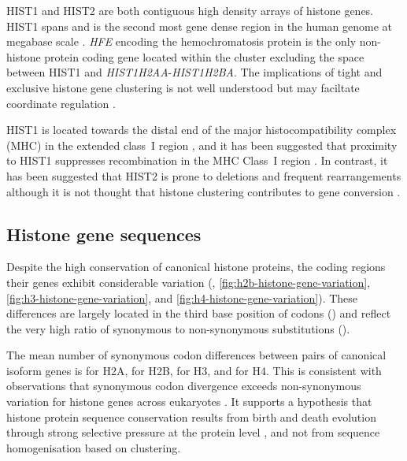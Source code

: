     HIST1 and HIST2 are both contiguous high density arrays of histone genes.
    HIST1 spans \HISTOneSpan{} 
    and is the second most gene dense region in the human genome at megabase scale \citep{MHC-III-analysis}.
    \textit{HFE} encoding the hemochromatosis protein \citep{AlbigDoenecke1998}
    is the only non-histone protein coding gene located within the cluster
    excluding the space between HIST1 and \textit{HIST1H2AA}-\textit{HIST1H2BA}.
    The implications of tight and exclusive histone gene clustering
    is not well understood but may faciltate coordinate regulation \citep{Eirinlopez2009,close-regulators}.

    HIST1 is located towards the distal end of the major histocompatibility complex (MHC)
    in the extended class~I region \citep{MHC-I-transcript, MHC-complete-sequencing-1999},
    and it has been suggested that proximity to HIST1
    suppresses recombination in the MHC Class~I region \citep{MHC-repressed-by-HIST}.
    In contrast, it has been suggested that HIST2 is prone to
    deletions and frequent rearrangements \citep{HISTTwo-prone-deletion-discovery, HISTTwo-prone-deletion-focus}
    although it is not thought that histone clustering contributes to gene conversion \citep{NeiRooney2005}.

  \subsection{Histone gene sequences}
    Despite the high conservation of canonical histone proteins,
    the coding regions their genes exhibit considerable variation
    (, \ref{fig:h2b-histone-gene-variation},
    \ref{fig:h3-histone-gene-variation}, and \ref{fig:h4-histone-gene-variation}).
    These differences are largely located in the third base position of codons ()
    and reflect the very high ratio of synonymous to non-synonymous substitutions ().

    The mean number of synonymous codon differences between pairs of canonical isoform genes is
     for H2A,
     for H2B,
     for H3,
    and  for H4.
    This is consistent with observations that
    synonymous codon divergence exceeds non-synonymous variation
    for histone genes across eukaryotes \citep{Piontkivska2002, Rooney2002}.
    It supports a hypothesis that histone protein sequence conservation
    results from birth and death evolution through strong selective pressure at the protein level \citep{NeiRooney2005},
    and not from sequence homogenisation based on clustering.

